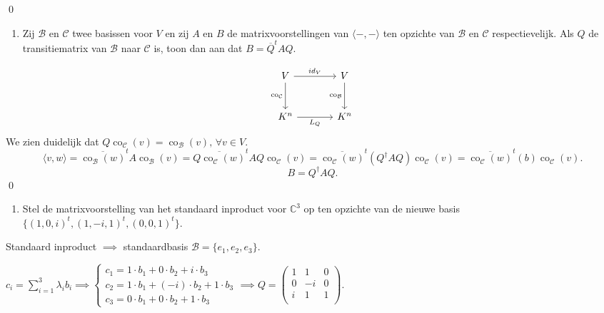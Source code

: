 \begin{oefening}[4.2.4]
    \qed
    \begin{enumerate}
        \item[(b)] Zij $\mathcal{B}$ en $\mathcal{C}$ twee basissen voor $V$ en zij $A$ en $B$ de matrixvoorstellingen van $\langle -, - \rangle$ ten opzichte van $\mathcal{B}$ en $\mathcal{C}$ respectievelijk. Als $Q$ de transitiematrix van $\mathcal{B}$ naar $\mathcal{C}$ is, toon dan aan dat $B = \overline{Q}^t A Q$.
    \end{enumerate}
    \begin{equation*}
    \begin{tikzcd}[row sep=large, column sep=large]
        V \arrow[r, "id_V"] \arrow[d, "\operatorname{co}_{\mathcal{C}}"'] &
        V \arrow[d, "\operatorname{co}_{\mathcal{B}}"'] \\
        K^n \arrow[r, "L_Q"'] & 
        K^n
    \end{tikzcd}
    \end{equation*}
    We zien duidelijk dat \(Q \operatorname{co}_{\mathcal{C}} (v) = \operatorname{co}_{\mathcal{B}}(v), \, \forall v \in V\).
    \[
    \langle v,w \rangle 
    = \overline{\operatorname{co}_{\mathcal{B}}(w)}^t A \operatorname{co}_{\mathcal{B}}(v)
    = \overline{Q \operatorname{co}_{\mathcal{C}}(w)}^t A Q \operatorname{co}_{\mathcal{C}} (v)
    = \overline{\operatorname{co}_{\mathcal{C}}(w)}^t( Q^\dagger A Q )\operatorname{co}_{\mathcal{C}} (v)
    = \overline{\operatorname{co}_{\mathcal{C}}(w)}^t(b)\operatorname{co}_{\mathcal{C}} (v).
    \]
    \[
    B = Q^\dagger A Q .
    \]
    \qed
    \begin{enumerate}
        \item[(c)] Stel de matrixvoorstelling van het standaard inproduct voor $\mathbb{C}^3$ op ten opzichte van de nieuwe basis $\{(1, 0, i)^t, (1, -i, 1)^t, (0, 0, 1)^t\}$.
    \end{enumerate}
    Standaard inproduct \(\implies\) standaardbasis \(\mathcal{B} = \{e_1,e_2,e_3\}\).

    \(c_i = \sum_{i=1}^{3} \lambda_i b_i \implies 
    \begin{cases}
        c_1 = 1 \cdot b_1 + 0 \cdot b_2 + i \cdot b_3 \\
        c_2 = 1 \cdot b_1 + (-i) \cdot b_2 + 1 \cdot b_3\\
        c_3 = 0 \cdot b_1 + 0 \cdot b_2 + 1 \cdot b_3
    \end{cases}
    \implies 
    Q= 
    \begin{pmatrix}
        1 & 1 & 0\\
        0 & -i & 0 \\
        i & 1 & 1\\
    \end{pmatrix}
    \).


\end{oefening}
